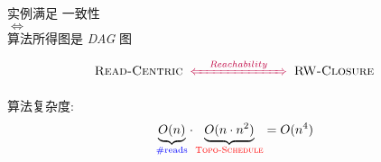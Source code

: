 \begin{frame}{}
  \begin{ctheorem}
    \begin{center}
      \emph{} 实例满足 \emph{\PRAM{}} 一致性 \\[5pt]
      $\iff$ \\[5pt]
      \readcentric{} 算法所得图是 \emph{DAG} 图
    \end{center}
  \end{ctheorem}

  \pause
  \vspace{0.30cm}
  \begin{cproof}
    \[
      \readcentric{}\;\; \purple{\xLeftrightarrow{\quad Reachability \quad}} \;\;\rwclosure{}
    \]
  \end{cproof}

  \pause
  \vspace{0.60cm}
  \readcentric{} 算法复杂度: 
  \[
    \underbrace{O(n)}_{\textrm{\textcolor{blue}{\#reads}}} \cdot
    \underbrace{O(n \cdot n^2)}_{\textcolor{red}{\textsc{Topo-Schedule}}} = O(n^4)
  \]
\end{frame}
